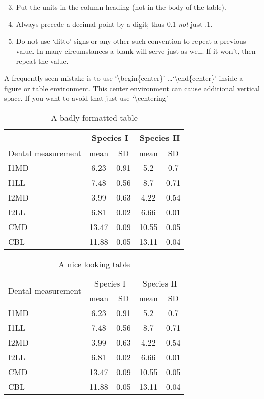 \begin{enumerate}\setcounter{enumi}{2}
  \item Put the units in the column heading (not in the body of
          the table).
  \item Always precede a decimal point by a digit; thus 0.1
      {\em not} just .1.
  \item Do not use `ditto' signs or any other such convention to
      repeat a previous value. In many circumstances a blank
      will serve just as well. If it won't, then repeat the value.
\end{enumerate}

A frequently seen mistake is to use `\textbackslash begin\{center\}' \dots `\textbackslash end\{center\}' inside a figure or table environment. This center environment can cause additional vertical space. If you want to avoid that just use `\textbackslash centering'


\begin{table}
\caption{A badly formatted table}
\centering
\label{table:bad_table}
\begin{tabular}{|l|c|c|c|c|}
\hline 
& \multicolumn{2}{c}{Species I} & \multicolumn{2}{c|}{Species II} \\ 
\hline
Dental measurement  & mean & SD  & mean & SD  \\ \hline 
\hline
I1MD & 6.23 & 0.91 & 5.2  & 0.7  \\
\hline 
I1LL & 7.48 & 0.56 & 8.7  & 0.71 \\
\hline 
I2MD & 3.99 & 0.63 & 4.22 & 0.54 \\
\hline 
I2LL & 6.81 & 0.02 & 6.66 & 0.01 \\
\hline 
CMD & 13.47 & 0.09 & 10.55 & 0.05 \\
\hline 
CBL & 11.88 & 0.05 & 13.11 & 0.04\\ 
\hline 
\end{tabular}
\end{table}

\begin{table}
\caption{A nice looking table}
\centering
\label{table:nice_table}
\begin{tabular}{l c c c c}
\hline 
\multirow{2}{*}{Dental measurement} & \multicolumn{2}{c}{Species I} & \multicolumn{2}{c}{Species II} \\ 
\cline{2-5}
  & mean & SD  & mean & SD  \\ 
\hline
I1MD & 6.23 & 0.91 & 5.2  & 0.7  \\

I1LL & 7.48 & 0.56 & 8.7  & 0.71 \\

I2MD & 3.99 & 0.63 & 4.22 & 0.54 \\

I2LL & 6.81 & 0.02 & 6.66 & 0.01 \\

CMD & 13.47 & 0.09 & 10.55 & 0.05 \\

CBL & 11.88 & 0.05 & 13.11 & 0.04\\ 
\hline 
\end{tabular}
\end{table}


